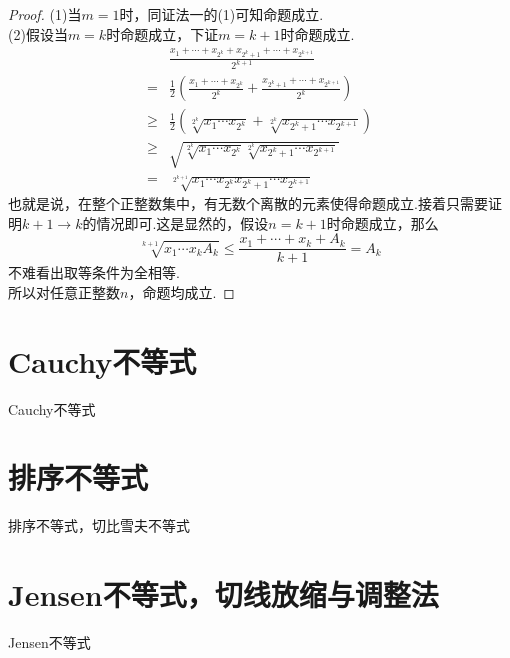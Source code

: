 \documentclass[lang=cn, zihao=5]{elegantbook}
\newcommand{\ssb}[1]{\left( #1 \right)}
\begin{document}
\begin{proof}
	(1)当$m=1$时，同证法一的(1)可知命题成立. \\
	(2)假设当$m=k$时命题成立，下证$m=k+1$时命题成立.
	\begin{align*}
		&\frac{x_1 + \cdots + x_{2^k} + x_{2^k+1} + \cdots + x_{2^{k+1}}}{2^{k+1}} \\
		=& \frac{1}{2} \ssb{\frac{x_1 + \cdots + x_{2^k}}{2^{k}} + \frac{x_{2^k+1} + \cdots + x_{2^{k+1}}}{2^{k}}} \\
		\geq & \frac{1}{2} (\sqrt[2^k]{x_1 \cdots x_{2^k}} + \sqrt[2^k]{x_{2^k+1} \cdots x_{2^{k+1}}}) \\
		\geq &\sqrt{\sqrt[2^k]{x_1 \cdots x_{2^k}}  \sqrt[2^k]{x_{2^k+1} \cdots x_{2^{k+1}}}} \\
		=& \sqrt[2^{k+1}]{x_1 \cdots x_{2^k}x_{2^k+1} \cdots x_{2^{k+1}}}
	\end{align*}
	也就是说，在整个正整数集中，有无数个离散的元素使得命题成立.接着只需要证明$k+1 \to k$的情况即可.这是显然的，假设$n=k+1$时命题成立，那么$$\sqrt[k+1]{x_1 \cdots x_kA_k} \leq \frac{x_1 + \cdots + x_k +A_k}{k+1} = A_k$$
	不难看出取等条件为全相等. \\
	所以对任意正整数$n$，命题均成立.
\end{proof}

\section{Cauchy不等式}

Cauchy不等式

\section{排序不等式}

排序不等式，切比雪夫不等式

\section{Jensen不等式，切线放缩与调整法}

Jensen不等式
\end{document}
